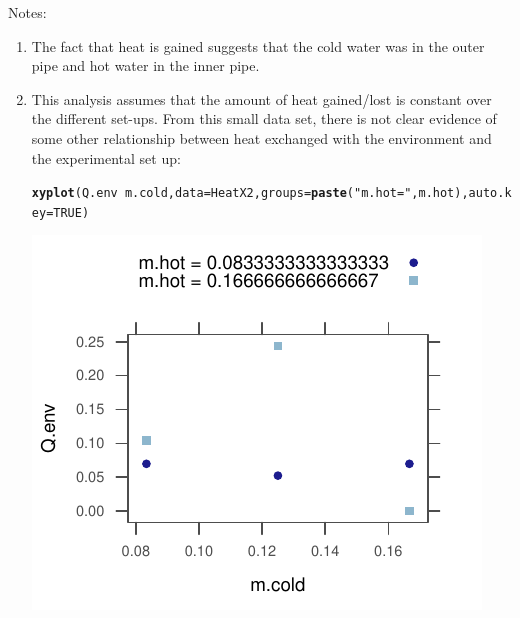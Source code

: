 \documentclass[twoside]{book}\usepackage[]{graphicx}\usepackage[]{xcolor}
\makeatletter
\def\maxwidth{ %
  \ifdim\Gin@nat@width>\linewidth
    \linewidth
  \else
    \Gin@nat@width
  \fi
}
\newcommand{\hlnum}[1]{\textcolor[rgb]{0.686,0.059,0.569}{#1}}%
\newcommand{\hlstr}[1]{\textcolor[rgb]{0.192,0.494,0.8}{#1}}%
\newcommand{\hlopt}[1]{\textcolor[rgb]{0,0,0}{#1}}%
\newcommand{\hlstd}[1]{\textcolor[rgb]{0.345,0.345,0.345}{#1}}%
\newcommand{\hlkwc}[1]{\textcolor[rgb]{0.333,0.667,0.333}{#1}}%
\newcommand{\hlkwd}[1]{\textcolor[rgb]{0.737,0.353,0.396}{\textbf{#1}}}%
\newenvironment{kframe}{%
 \def\at@end@of@kframe{}%
 \ifinner\ifhmode%
  \def\at@end@of@kframe{\end{minipage}}%
  \begin{minipage}{\columnwidth}%
 \fi\fi%
 \def\FrameCommand##1{\hskip\@totalleftmargin \hskip-\fboxsep
 \colorbox{shadecolor}{##1}\hskip-\fboxsep
     \hskip-\linewidth \hskip-\@totalleftmargin \hskip\columnwidth}%
 \MakeFramed {\advance\hsize-\width
   \@totalleftmargin\z@ \linewidth\hsize
   \@setminipage}}%
 {\par\unskip\endMakeFramed%
 \at@end@of@kframe}
\newenvironment{knitrout}{}{} %
\makeatother
\begin{document}
Notes:
\begin{enumerate}
\item
The fact that heat is gained suggests that the cold water was in the
outer pipe and hot water in the inner pipe.
\item  This analysis assumes that the amount of heat gained/lost is constant over 
the different set-ups.  From this small data set, there is not clear evidence 
of some other relationship between heat exchanged with the environment
and the experimental set up:
\begin{knitrout}
\color{fgcolor}\begin{kframe}
\begin{alltt}
\hlkwd{xyplot}\hlstd{(Q.env} \hlopt{~} \hlstd{m.cold,} \hlkwc{data} \hlstd{= HeatX2,} \hlkwc{groups} \hlstd{=} \hlkwd{paste}\hlstd{(}\hlstr{"m.hot ="}\hlstd{, m.hot),} \hlkwc{auto.key} \hlstd{=} \hlnum{TRUE}\hlstd{)}
\end{alltt}
\end{kframe}

{\centering \includegraphics[width=\maxwidth]{figures/fig-unnamed-chunk-301-1} 

}




\end{knitrout}
\end{enumerate}
\end{document}
